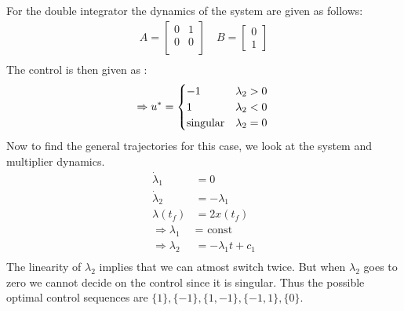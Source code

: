 \begin{enumerate}
     For the double integrator the dynamics of the system are given as follows:
       \begin{align*}
        A = \begin{bmatrix}
             0 & 1 \\
             0 & 0 \\
            \end{bmatrix} \quad 
        B = \begin{bmatrix}
             0 \\
             1
            \end{bmatrix}\\
       \end{align*}
       The control is then given as :
	 \begin{equation*}
	\Rightarrow u^* = \begin{cases}
                         -1 & \lambda_2 > 0\\
                         1 & \lambda_2 < 0\\
                         \mbox{singular} & \lambda_2 = 0
                        \end{cases}\\  
	 \end{equation*}
    Now to find the general trajectories for this case, we look at the system and multiplier dynamics. 
    \begin{align*}
    \dot \lambda_1 &= 0\\
    \dot \lambda_2  &= - \lambda_1\\
    \lambda(t_f) &= 2 x(t_f) \\
    \Rightarrow \lambda_1 &= \mbox{ const } \\
    \Rightarrow \lambda_2 &= -\lambda_1 t + c_1 \\
    \end{align*}
    The linearity of $\lambda_2$ implies that we can atmost switch twice. But when $\lambda_2$ goes to zero we cannot decide on
the control since it is singular. Thus the possible optimal control sequences are $\{1\}, \{-1\}, \{1, -1\}, \{-1,1\},\{0\}$.  


\end{enumerate}
